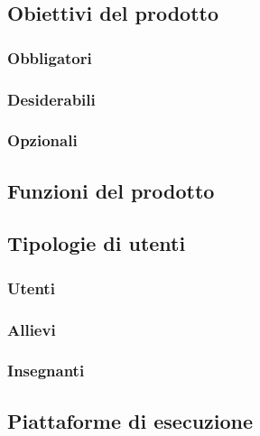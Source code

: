 \subsection{Obiettivi del prodotto}
\subsubsection{Obbligatori}
\subsubsection{Desiderabili}
\subsubsection{Opzionali}
\subsection{Funzioni del prodotto}
\subsection{Tipologie di utenti}
\subsubsection{Utenti}
\subsubsection{Allievi}
\subsubsection{Insegnanti}
\subsection{Piattaforme di esecuzione}

